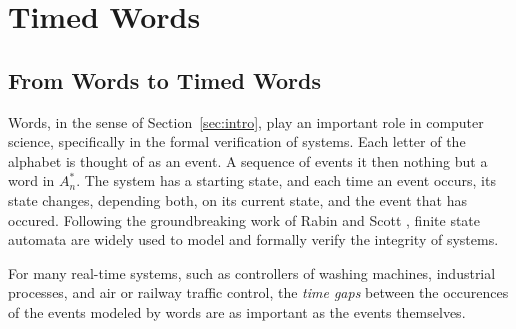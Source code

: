 \documentclass[10pt]{amsproc}
\theoremstyle{definition}
\theoremstyle{remark}
\begin{document}
\section{Timed Words}
\subsection{From Words to Timed Words}
\label{sec:timed-words}
\label{sec:words-to-timed-words}
Words, in the sense of Section~\ref{sec:intro}, play an important role in computer science, specifically in the formal verification of systems.
Each letter of the alphabet is thought of as an event.
A sequence of events it then nothing but a word in $A_n^*$.
The system has a starting state, and each time an event occurs, its state changes, depending both, on its current state, and the event that has occured.
Following the groundbreaking work of Rabin and Scott \cite{rabin1959finite}, finite state automata are widely used to model and formally verify the integrity of systems.

For many real-time systems, such as controllers of washing machines, industrial processes, and air or railway traffic control, the \emph{time gaps} between the occurences of the events modeled by words are as important as the events themselves.
\end{document}

